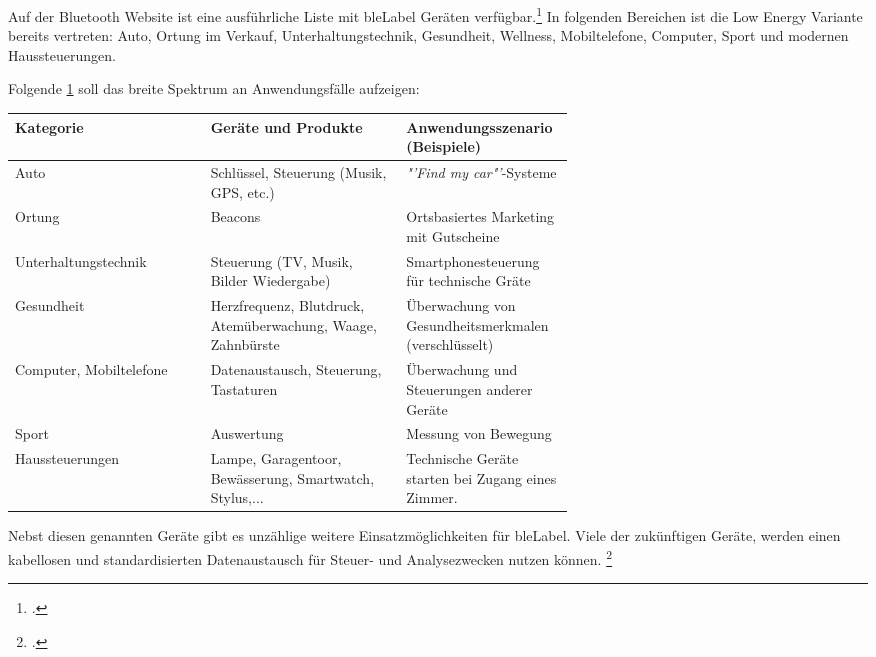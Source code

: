 Auf der Bluetooth Website ist eine ausführliche Liste mit \gls{bleLabel} Geräten verfügbar.\footcite{Bluetooth_Smart_Devices_List_Bluetooth_Technology_Website_2015-05-14}
In folgenden Bereichen ist die Low Energy Variante bereits vertreten: Auto, Ortung im Verkauf, Unterhaltungstechnik, Gesundheit, Wellness, Mobiltelefone, Computer, Sport und modernen Haussteuerungen.

Folgende \cref{tab:usecases} soll das breite Spektrum an Anwendungsfälle aufzeigen:
\begin{table}[H]
	\small\sffamily\renewcommand{\arraystretch}{1.4}
	\label{tab:usecases}
	\begin{tabular}{lp{0.35\linewidth}p{0.30\linewidth}}
		\toprule
		Kategorie & Geräte und Produkte & Anwendungsszenario (Beispiele)\\
		\midrule
		Auto & Schlüssel, Steuerung (Musik, GPS, etc.) & \textit{"'Find my car"'}-Systeme\\
		Ortung & Beacons & Ortsbasiertes Marketing mit Gutscheine\\
		Unterhaltungstechnik & Steuerung (TV, Musik, Bilder Wiedergabe) & Smartphonesteuerung für technische Gräte\\
		Gesundheit & Herzfrequenz, Blutdruck, Atemüberwachung, Waage, Zahnbürste & Überwachung von Gesundheitsmerkmalen (verschlüsselt)\\
		Computer, Mobiltelefone & Datenaustausch, Steuerung, Tastaturen & Überwachung und Steuerungen anderer Geräte\\
		Sport & Auswertung & Messung von Bewegung\\
		Haussteuerungen & Lampe, Garagentoor, Bewässerung, Smartwatch, Stylus,... & Technische Geräte starten bei Zugang eines Zimmer.\\
		\bottomrule
	\end{tabular}
\end{table}

Nebst diesen genannten Geräte gibt es unzählige weitere Einsatzmöglichkeiten für \gls{bleLabel}.
Viele der zukünftigen Geräte, werden einen kabellosen und standardisierten Datenaustausch für Steuer- und Analysezwecken nutzen können.
\footcite[][3,5]{ti_whitepaper_2015-05-08}





